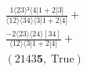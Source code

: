 \documentclass[varwidth, border=5pt]{standalone}
\begin{document}
\begin{my}
$\begin{gathered}
\scriptscriptstyle\frac{1⟨23⟩²⟨4|1+2|3]}{⟨12⟩⟨34⟩⟨3|1+2|4]} +\\
\scriptscriptstyle\frac{-2⟨23⟩⟨24⟩[34]}{⟨12⟩⟨3|1+2|4]} +\\
\scriptscriptstyle(2143𝟓,\;\text{True}) \phantom{+}
\end{gathered}$
\end{my}
\end{document}
